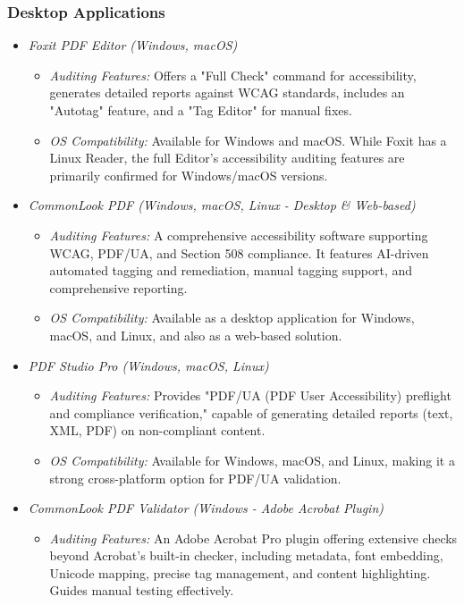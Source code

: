 \subsubsection{Desktop Applications}
\label{subsubsec:desktop-apps}
\begin{itemize}
\item \emph{Foxit PDF Editor (Windows, macOS)}\cite{FoxitManual}
\begin{itemize}
\item \emph{Auditing Features:} Offers a "Full Check" command for accessibility, generates detailed reports against WCAG standards, includes an "Autotag" feature, and a "Tag Editor" for manual fixes.
\item \emph{OS Compatibility:} Available for Windows and macOS. While Foxit has a Linux Reader, the full Editor's accessibility auditing features are primarily confirmed for Windows/macOS versions.
\end{itemize}
\item \emph{CommonLook PDF (Windows, macOS, Linux - Desktop \& Web-based)}\cite{AllyantCommonLook}
\begin{itemize}
\item \emph{Auditing Features:} A comprehensive accessibility software supporting WCAG, PDF/UA, and Section 508 compliance. It features AI-driven automated tagging and remediation, manual tagging support, and comprehensive reporting.
\item \emph{OS Compatibility:} Available as a desktop application for Windows, macOS, and Linux, and also as a web-based solution.
\end{itemize}
\item \emph{PDF Studio Pro (Windows, macOS, Linux)}\cite{QoppaPDFStudio}
\begin{itemize}
\item \emph{Auditing Features:} Provides "PDF/UA (PDF User Accessibility) preflight and compliance verification," capable of generating detailed reports (text, XML, PDF) on non-compliant content.
\item \emph{OS Compatibility:} Available for Windows, macOS, and Linux, making it a strong cross-platform option for PDF/UA validation.
\end{itemize}
\item \emph{CommonLook PDF Validator (Windows - Adobe Acrobat Plugin)}\cite{AllyantValidator}
\begin{itemize}
\item \emph{Auditing Features:} An Adobe Acrobat Pro plugin offering extensive checks beyond Acrobat's built-in checker, including metadata, font embedding, Unicode mapping, precise tag management, and content highlighting. Guides manual testing effectively.

\end{itemize}
\end{itemize}
